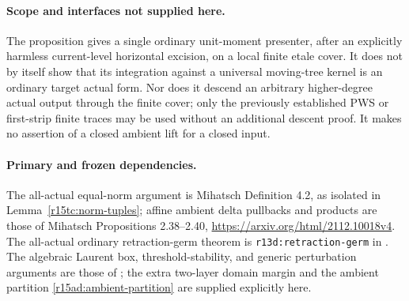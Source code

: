 \paragraph{Scope and interfaces not supplied here.}
The proposition gives a single ordinary unit-moment
presenter, after an explicitly harmless current-level
horizontal excision, on a local finite etale cover.
It does not by itself show that its integration against
a universal moving-tree kernel is an ordinary target
actual form.  Nor does it descend an arbitrary
higher-degree actual output through the finite cover;
only the previously established PWS or first-strip
finite traces may be used without an additional
descent proof.  It makes no assertion of a closed
ambient lift for a closed input.

\paragraph{Primary and frozen dependencies.}
The all-actual equal-norm argument is Mihatsch
Definition 4.2, as isolated in
Lemma~\ref{r15tc:norm-tuples}; affine ambient delta
pullbacks and products are those of Mihatsch
Propositions 2.38--2.40,
\url{https://arxiv.org/html/2112.10018v4}.
The all-actual ordinary retraction-germ theorem is
\texttt{r13d:retraction-germ} in
.
The algebraic Laurent box, threshold-stability, and
generic perturbation arguments are those of
;
the extra two-layer domain margin and the ambient
partition \eqref{r15ad:ambient-partition} are supplied
explicitly here.
